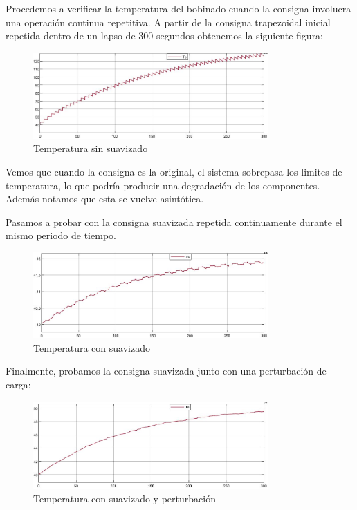 \documentclass{article}
\begin{document}
Procedemos a verificar la temperatura del bobinado cuando la consigna involucra una operación 
continua repetitiva. A partir de la consigna 
trapezoidal inicial repetida dentro de un lapso de $300$ segundos obtenemos la siguiente figura:

\begin{figure}[H]
    \centering
    \includegraphics[width=0.8\textwidth]{5.2.5.1.c.1.png}
    \caption{Temperatura sin suavizado}
\end{figure}

Vemos que cuando la consigna es la original, el sistema sobrepasa los limites de temperatura, lo 
que podría producir una degradación de los componentes. Además notamos que esta se vuelve asintótica.

Pasamos a probar con la consigna suavizada repetida continuamente durante el mismo periodo de tiempo.
    
\begin{figure}[H]
    \centering
    \includegraphics[width=0.8\textwidth]{5.2.5.1.c.2.png}
    \caption{Temperatura con suavizado}
\end{figure}

Finalmente, probamos la consigna suavizada junto con una perturbación de carga:

\begin{figure}[H]
    \centering
    \includegraphics[width=0.8\textwidth]{5.2.5.1.c.3.png}
    \caption{Temperatura con suavizado y perturbación}
\end{figure}
    
\end{document}
